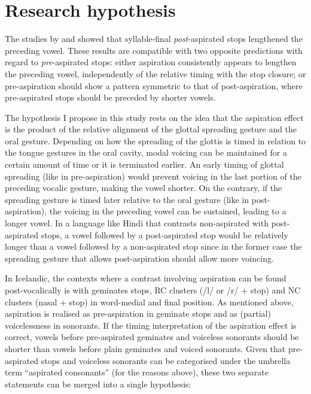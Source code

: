\documentclass[11pt,a4paper,openany]{memoir}\usepackage[]{graphicx}\usepackage[]{color}
\begin{document}
\section{Research hypothesis}
\label{s:hypothesis}

The studies by \citet{maddieson1976} and \citet{durvasula2012} showed that syllable-final \textit{post}-aspirated stops lengthened the preceding vowel.
These results are compatible with two opposite predictions with regard to \textit{pre}-aspirated stops: either aspiration consistently appears to lengthen the preceding vowel, independently of the relative timing with the stop closure; or pre-aspiration should show a pattern symmetric to that of post-aspiration, where pre-aspirated stops should be preceded by shorter vowels.

The hypothesis I propose in this study rests on the idea that the aspiration effect is the product of the relative alignment of the glottal spreading gesture and the oral gesture.
Depending on how the spreading of the glottis is timed in relation to the tongue gestures in the oral cavity, modal voicing can be maintained for a certain amount of time or it is terminated earlier.
An early timing of glottal spreading (like in pre-aspiration) would prevent voicing in the last portion of the preceding vocalic gesture, making the vowel shorter.
On the contrary, if the spreading gesture is timed later relative to the oral gesture (like in post-aspiration), the voicing in the preceding vowel can be sustained, leading to a longer vowel.
In a language like Hindi that contrasts non-aspirated with post-aspirated stops, a vowel followed by a post-aspirated stop would be relatively longer than a vowel followed by a non-aspirated stop since in the former case the spreading gesture that allows post-aspiration should allow more voincing.

In Icelandic, the contexts where a contrast involving aspiration can be found post-vocalically is with geminates stops, RC clusters (/l/ or /r/ + stop) and NC clusters (nasal + stop) in word-medial and final position.
As mentioned above, aspiration is realised as pre-aspiration in geminate stops and as (partial) voicelessness in sonorants.
If the timing interpretation of the aspiration effect is correct, vowels before pre-aspirated geminates and voiceless sonorants should be shorter than vowels before plain geminates and voiced sonorants.
Given that pre-aspirated stops and voiceless sonorants can be categorised under the umbrella term ``aspirated consonants'' (for the reasons above), these two separate statements can be merged into a single hypothesis:
\end{document}
